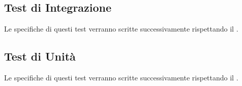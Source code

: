 \begin{center}
\begin{longtable}{|c|p{10cm}|c|}
			  


			\end{longtable}
		\end{center}


	\subsection{Test di Integrazione}
		Le specifiche di questi test verranno scritte successivamente rispettando il . 

	\subsection{Test di Unità}
	 	Le specifiche di questi test verranno scritte successivamente rispettando il . 
